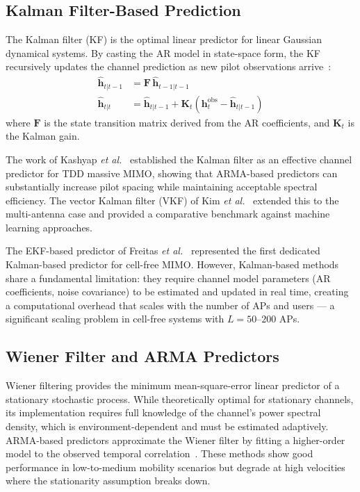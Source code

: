\documentclass[12pt,a4paper]{article}
\newcommand{\bh}{\mathbf{h}}
\newcommand{\bF}{\mathbf{F}}
\newcommand{\bK}{\mathbf{K}}
\begin{document}
\subsection{Kalman Filter-Based Prediction}

The Kalman filter (KF) is the optimal linear predictor for linear
Gaussian dynamical systems. By casting the AR model in state-space
form, the KF recursively updates the channel prediction as new pilot
observations arrive~\cite{Kashyap2017kalman}:
\begin{align}
  \hat{\bh}_{t|t-1} &= \bF\,\hat{\bh}_{t-1|t-1} \\
  \hat{\bh}_{t|t}   &= \hat{\bh}_{t|t-1} + \bK_t\!\left(\bh_t^{\mathrm{obs}} - \hat{\bh}_{t|t-1}\right)
\end{align}
where $\bF$ is the state transition matrix derived from the AR
coefficients, and $\bK_t$ is the Kalman gain.

The work of Kashyap \textit{et al.}~\cite{Kashyap2017kalman}
established the Kalman filter as an effective channel predictor for TDD
massive MIMO, showing that ARMA-based predictors can substantially
increase pilot spacing while maintaining acceptable spectral efficiency.
The vector Kalman filter (VKF) of Kim \textit{et al.}~\cite{Kim2021kalman}
extended this to the multi-antenna case and provided a comparative
benchmark against machine learning approaches.

The EKF-based predictor of Freitas \textit{et al.}~\cite{Freitas2025ekf}
represented the first dedicated Kalman-based predictor for cell-free
MIMO. However, Kalman-based methods share a fundamental limitation:
they require channel model parameters (AR coefficients, noise covariance)
to be estimated and updated in real time, creating a computational
overhead that scales with the number of APs and users --- a significant
scaling problem in cell-free systems with $L = 50$--$200$ APs.

\subsection{Wiener Filter and ARMA Predictors}

Wiener filtering provides the minimum mean-square-error linear predictor
of a stationary stochastic process. While theoretically optimal for
stationary channels, its implementation requires full knowledge of the
channel's power spectral density, which is environment-dependent and
must be estimated adaptively. ARMA-based predictors approximate the
Wiener filter by fitting a higher-order model to the observed temporal
correlation~\cite{Kashyap2017kalman}. These methods show good
performance in low-to-medium mobility scenarios but degrade at high
velocities where the stationarity assumption breaks down.
\end{document}

